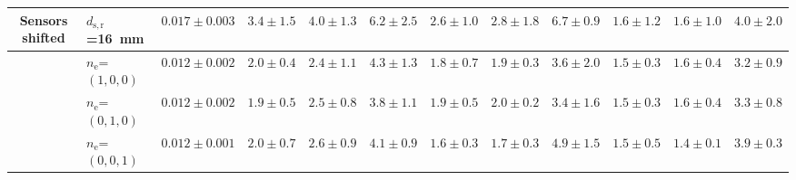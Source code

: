 \begin{landscape}
\begin{table}[hbt]
\begin{tabular}{cl r rrr rrr rrr}
Sensors shifted & $d_{\mathrm{s},\mathrm{r}}$=\SI{16}{mm} & $0.017 \pm 0.003$ & $3.4 \pm 1.5$ & $4.0 \pm 1.3$ & $6.2 \pm 2.5$ & $2.6 \pm 1.0$ & $2.8 \pm 1.8$ & $6.7 \pm 0.9$ & $1.6 \pm 1.2$ & $1.6 \pm 1.0$ & $4.0 \pm 2.0$ \\
\midrule
{} & $n_\mathrm{e}$=$(1,0,0)$ & $0.012 \pm 0.002$ & $2.0 \pm 0.4$ & $2.4 \pm 1.1$ & $4.3 \pm 1.3$ & $1.8 \pm 0.7$ & $1.9 \pm 0.3$ & $3.6 \pm 2.0$ & $1.5 \pm 0.3$ & $1.6 \pm 0.4$ & $3.2 \pm 0.9$\\
& $n_\mathrm{e}$=$(0,1,0)$ & $0.012 \pm 0.002$ & $1.9 \pm 0.5$ & $2.5 \pm 0.8$ & $3.8 \pm 1.1$ & $1.9 \pm 0.5$ & $2.0 \pm 0.2$ & $3.4 \pm 1.6$ & $1.5 \pm 0.3$ & $1.6 \pm 0.4$ & $3.3 \pm 0.8$\\
& $n_\mathrm{e}$=$(0,0,1)$ & $0.012 \pm 0.001$ & $2.0 \pm 0.7$ & $2.6 \pm 0.9$ & $4.1 \pm 0.9$ & $1.6 \pm 0.3$ & $1.7 \pm 0.3$ & $4.9 \pm 1.5$ & $1.5 \pm 0.5$ & $1.4 \pm 0.1$ & $3.9 \pm 0.3$\\
\bottomrule
\end{tabular}
\label{tab:results_pcc_simulations}
\end{table}
\endgroup
\end{landscape}

